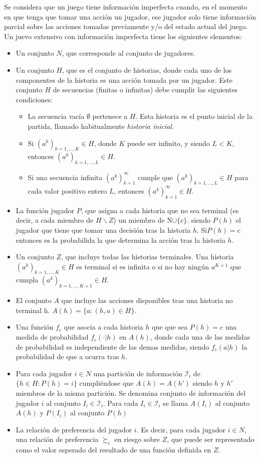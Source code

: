 Se considera que un juego tiene información imperfecta cuando, en el momento en que tenga que tomar una acción un jugador, ese jugador solo tiene información parcial sobre las acciones tomadas previamente y/o del estado actual del juego. Un juevo extensivo con información imperfecta tiene los siguientes elementos:
\begin{itemize}
\item Un conjunto $N$, que corresponde al conjunto de jugadores.
\item Un conjunto $H$, que es el conjunto de historias, donde cada uno de los componentes de la historia es una acción tomada por un jugador. Este conjunto $H$ de secuencias (finitas o infinitas) debe cumplir las siguientes condiciones:
\begin{itemize}
\item La secuencia vacía  $\emptyset$ pertenece a $H$. Esta historia es el punto inicial de la partida, llamado habitualmente \textit{historia inicial}.
\item Si $(a^k)_{k=1,...,K}\in H$, donde $K$ puede ser infinito, y siendo $L< K$, entonces $(a^k)_{k=1,...,L}\in H$.
\item Si una secuencia infinita $(a^k)^\infty_{k=1}$ cumple que $(a^k)_{k=1,...,L}\in H$ para cada valor positivo entero $L$, entonces  $(a^k)^\infty_{k=1}\in H$.
   \end{itemize}
\item La función jugador $P$, que asigna a cada historia que no sea terminal (es decir, a cada miembro de $ H\backslash  Z$) un miembro de N$ \cup \{c\}$. siendo $P(h)$ el jugador que tiene que tomar una decisión tras la historia $h$. Si$ P(h) = c$  entonces es la probabilida la que determina la acción tras la historia $h$.
\item Un conjunto $Z$, que incluye todas las historias terminales. Una historia $(a^k)_{k=1,...,K}\in H$ es terminal si es infinita o si no hay ningún $a^{K+1}$ que cumpla  $(a^k)_{k=1,...,K+1}\in H$.
\item El conjunto $A$ que incluye las acciones disponibles tras una historia no terminal h. $A(h)=\{a:(h,a) \in H \}$.
\item Una función $f_c$ que asocia a cada historia $h$ que que sea $ P(h) = c$ una medida de probabilidad $f_c(\cdot|h)$ en $A(h)$, donde cada una de las medidas de probabilidad es independiente de las demas medidas, siendo $f_c(a|h)$ la probabilidad de que a ocurra tras $h$.
\item Para cada jugador $ i \in N$ una partición de información $\mathcal{I}_i$ de $\{ h \in H:P(h) = i \} $ cumpliéndose que $A(h) = A(h')$ siendo $h$ y $h'$ miembros de la misma partición. Se denomina conjunto de información del jugador $i$ al conjunto $I_i \in \mathcal{I}_i$.  Para cada $I_i \in \mathcal{I}_i$ se llama $A(I_i)$ al conjunto $A(h)$ y $P(I_i)$ al conjunto $P(h)$
\item La relación de preferencia del jugador $i$. Es decir, para cada jugador $i \in N$, una relación de preferencia $\succsim_i$ en riesgo sobre $Z$, que puede ser representado como el valor esperado del resultado de una función definida en $Z$.
\end{itemize} 

